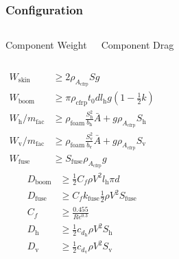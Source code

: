 \documentclass{beamer}
\begin{document}
\begin{frame}
    \frametitle{Configuration}
    
    \begin{columns}
        \begin{center}
        Component Weight
        \end{center}
        \begin{center}
        Component Drag
        \end{center}
    \end{columns}

    \begin{columns}
        \scriptsize
        \begin{align*}
        W_{\text{skin}} &\geq 2 \rho_{A_{\text{cfrp}}} S g \\
        W_{\text{boom}} &\geq \pi \rho_{\text{cfrp}} t_0 d l_{\text{h}}g \left( 1 - \frac{1}{2} k\right) \\
        W_{\text{h}}/m_{\text{fac}} &\geq \rho_{\text{foam}} \frac{S_{\text{h}}^2}{b_{\text{h}}} \bar{A} + g\rho_{A_{\text{cfrp}}} S_{\text{h}} \\
        W_{\text{v}}/m_{\text{fac}} &\geq \rho_{\text{foam}} \frac{S_{\text{v}}^2}{b_{\text{v}}} \bar{A} + g\rho_{A_{\text{cfrp}}} S_{\text{v}} \\
            W_{\text{fuse}} &\geq S_{\text{fuse}} \rho_{A_{\text{cfrp}}} g
        \end{align*}
        \scriptsize
        \begin{align*}
        D_{\text{boom}} &\geq \frac{1}{2} C_f \rho V^2 l_{\text{h}}\pi d \\
        D_{\text{fuse}} &\geq C_f k_{\text{fuse}} \frac{1}{2} \rho V^2 S_{\text{fuse}} \\
        C_f &\geq \frac{0.455}{Re^{0.3}} \\
        D_{\text{h}} &\geq \frac{1}{2} c_{d_{\text{h}}} \rho V^2 S_{\text{h}} \\
        D_{\text{v}} &\geq \frac{1}{2} c_{d_{\text{v}}} \rho V^2 S_{\text{v}} 
        \end{align*}
    \end{columns}

\end{frame}
\end{document}
